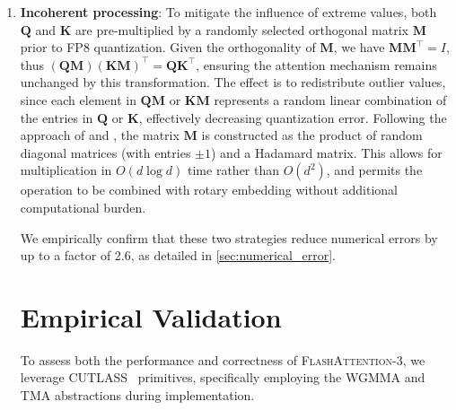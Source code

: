 \begin{enumerate}
\begin{algorithm}[H]
\begin{algorithmic}[1]
\begin{enumerate}
\item \textbf{Incoherent processing}: To mitigate the influence of extreme values, both $\mathbf{Q}$ and $\mathbf{K}$ are pre-multiplied by a randomly selected orthogonal matrix $\mathbf{M}$ prior to FP8 quantization. Given the orthogonality of $\mathbf{M}$, we have $\mathbf{M} \mathbf{M}^\top = I$, thus $(\mathbf{Q} \mathbf{M}) (\mathbf{K} \mathbf{M})^\top = \mathbf{Q} \mathbf{K}^\top$, ensuring the attention mechanism remains unchanged by this transformation. The effect is to redistribute outlier values, since each element in $\mathbf{Q} \mathbf{M}$ or $\mathbf{K} \mathbf{M}$ represents a random linear combination of the entries in $\mathbf{Q}$ or $\mathbf{K}$, effectively decreasing quantization error. Following the approach of \citet{chee2024quip} and \citet{tseng2024quip}, the matrix $\mathbf{M}$ is constructed as the product of random diagonal matrices (with entries $\pm 1$) and a Hadamard matrix. This allows for multiplication in $O(d \log d)$ time rather than $O(d^2)$, and permits the operation to be combined with rotary embedding without additional computational burden.

We empirically confirm that these two strategies reduce numerical errors by up to a factor of 2.6, as detailed in \cref{sec:numerical_error}.

\section{Empirical Validation}
\label{sec:exp}

To assess both the performance and correctness of \textsc{FlashAttention-3}, we leverage CUTLASS~\citep{Thakkar_CUTLASS_2023} primitives, specifically employing the WGMMA and TMA abstractions during implementation.

\begin{itemize}


\end{itemize}
\end{enumerate}
\end{algorithmic}
\end{algorithm}
\end{enumerate}
